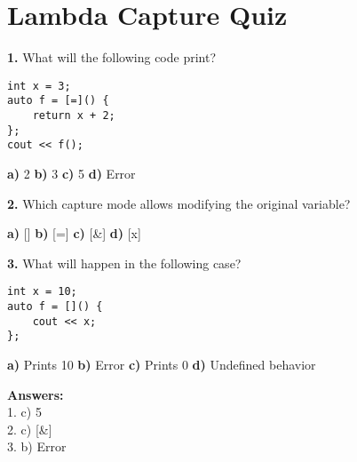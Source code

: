 \documentclass[12pt]{article}
\begin{document}
\section*{Lambda Capture Quiz}

\textbf{1.} What will the following code print?

\begin{verbatim}
int x = 3;
auto f = [=]() {
    return x + 2;
};
cout << f();
\end{verbatim}

\textbf{a)} 2 \quad \textbf{b)} 3 \quad \textbf{c)} 5 \quad \textbf{d)} Error

\vspace{1em}

\textbf{2.} Which capture mode allows modifying the original variable?

\textbf{a)} [] \quad \textbf{b)} [=] \quad \textbf{c)} [&] \quad \textbf{d)} [x]

\vspace{1em}

\textbf{3.} What will happen in the following case?

\begin{verbatim}
int x = 10;
auto f = []() {
    cout << x;
};
\end{verbatim}

\textbf{a)} Prints 10 \quad \textbf{b)} Error \quad \textbf{c)} Prints 0 \quad \textbf{d)} Undefined behavior

\vspace{2em}
\textbf{Answers:} \\
1. c) 5 \\
2. c) [&] \\
3. b) Error
\end{document}
